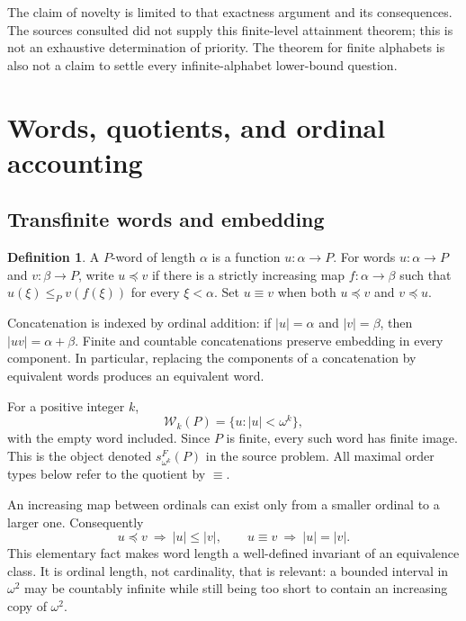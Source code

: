 \documentclass[11pt,letterpaper]{article}
\theoremstyle{definition}
\newtheorem{definition}[definition]{Definition}
\theoremstyle{remark}
\newcommand{\W}{\mathcal W}
\newcommand{\emb}{\preccurlyeq}
\begin{document}
The claim of novelty is limited to that exactness argument and its
consequences. The sources consulted did not supply this finite-level
attainment theorem; this is not an exhaustive determination of priority.
The theorem for finite alphabets is also not a claim to settle every
infinite-alphabet lower-bound question.

\section{Words, quotients, and ordinal accounting}\label{sec:background}

\subsection{Transfinite words and embedding}

\begin{definition}
A $P$-word of length $\alpha$ is a function $u\colon\alpha\to P$.
For words $u\colon\alpha\to P$ and $v\colon\beta\to P$, write $u\emb v$
if there is a strictly increasing map $f\colon\alpha\to\beta$ such that
$u(\xi)\le_P v(f(\xi))$ for every $\xi<\alpha$.
Set $u\equiv v$ when both $u\emb v$ and $v\emb u$.
\end{definition}

Concatenation is indexed by ordinal addition: if $|u|=\alpha$ and
$|v|=\beta$, then $|uv|=\alpha+\beta$. Finite and countable concatenations
preserve embedding in every component. In particular, replacing the
components of a concatenation by equivalent words produces an equivalent
word.

For a positive integer $k$,
\[
  \W_k(P)=\{u:|u|<\omega^k\},
\]
with the empty word included. Since $P$ is finite, every such word has finite
image. This is the object denoted $s^F_{\omega^k}(P)$ in the source problem.
All maximal order types below refer to the quotient by $\equiv$.

An increasing map between ordinals can exist only from a smaller ordinal
to a larger one. Consequently
\begin{equation}\label{eq:lengthmonotone}
  u\emb v\ \Longrightarrow\ |u|\le|v|,
  \qquad u\equiv v\ \Longrightarrow\ |u|=|v|.
\end{equation}
This elementary fact makes word length a well-defined invariant of an
equivalence class. It is ordinal length, not cardinality, that is relevant:
a bounded interval in $\omega^2$ may be countably infinite while still being
too short to contain an increasing copy of $\omega^2$.
\end{document}
